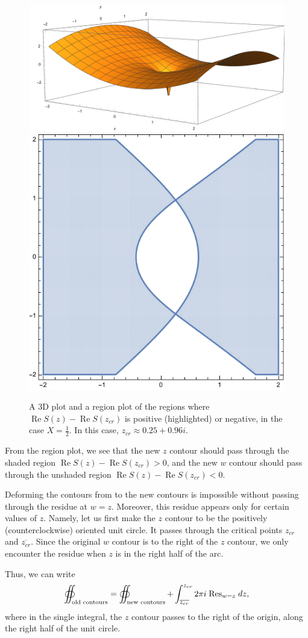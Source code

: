 \documentclass[letterpaper,11pt,oneside,reqno]{book}
\numberwithin{equation}{chapter}  %
\newcommand{\ssp}{\hspace{1pt}}
\theoremstyle{definition}
\begin{document}
\begin{figure}[htpb]
	\centering
	\includegraphics[height=.3\textwidth]{pictures/ReS_imaginary_3D.pdf}
	\qquad
	\includegraphics[height=.3\textwidth]{pictures/ReS_imaginary_region.pdf}
	\caption{A 3D plot and a region plot of the
	regions where $\operatorname{Re}S(z)-\operatorname{Re}S(z_{cr})$ is positive
	(highlighted) or negative, in the case $X=\frac{1}{2}$.
	In this case, $z_{cr}\approx 0.25+0.96 i$.}
	\label{lecture6:fig:ReS_imaginary}
\end{figure}

From the region plot, we see that the new $z$ contour should
pass through the shaded region $\operatorname{Re}S(z)-\operatorname{Re}S(z_{cr})>0$,
and the new $w$ contour should pass through the unshaded region
$\operatorname{Re}S(z)-\operatorname{Re}S(z_{cr})<0$.

Deforming the contours from  to the new contours
is impossible without passing through the residue at $w=z$.
Moreover, this residue appears only for certain values of $z$. Namely,
let us first make the $z$ contour to be the positively (counterclockwise) oriented
unit circle.
It passes through the critical points $z_{cr}$ and $\overline{z_{cr}}$.
Since the original $w$ contour is to the right of the $z$ contour, we only
encounter the residue when $z$ is in the right half of the arc.

Thus, we can write
\begin{equation}
	\label{lecture6:eq:K_n_bulk_deformation}
	\oiint_{\textnormal{old contours}}=
	\oiint_{\textnormal{new contours}}
	+
	\int_{\overline{z_{cr}}}^{z_{cr}}
	2\pi i\ssp \operatorname{Res}\limits_{w=z}\ssp dz,
\end{equation}
where in the single integral, the $z$ contour passes to the right of the origin,
along the right half of the unit circle.
\end{document}
